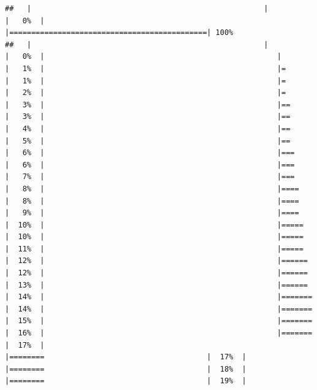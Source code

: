 \documentclass[
  krantz2]{krantz}
\begin{document}
\begin{verbatim}
##   |                                                     |                                             |   0%  |                                                     |=============================================| 100%
##   |                                                     |                                             |   0%  |                                                     |                                             |   1%  |                                                     |=                                            |   1%  |                                                     |=                                            |   2%  |                                                     |=                                            |   3%  |                                                     |==                                           |   3%  |                                                     |==                                           |   4%  |                                                     |==                                           |   5%  |                                                     |==                                           |   6%  |                                                     |===                                          |   6%  |                                                     |===                                          |   7%  |                                                     |===                                          |   8%  |                                                     |====                                         |   8%  |                                                     |====                                         |   9%  |                                                     |====                                         |  10%  |                                                     |=====                                        |  10%  |                                                     |=====                                        |  11%  |                                                     |=====                                        |  12%  |                                                     |======                                       |  12%  |                                                     |======                                       |  13%  |                                                     |======                                       |  14%  |                                                     |=======                                      |  14%  |                                                     |=======                                      |  15%  |                                                     |=======                                      |  16%  |                                                     |=======                                      |  17%  |                                                     |========                                     |  17%  |                                                     |========                                     |  18%  |                                                     |========                                     |  19%  |     
\end{verbatim}
\end{document}
